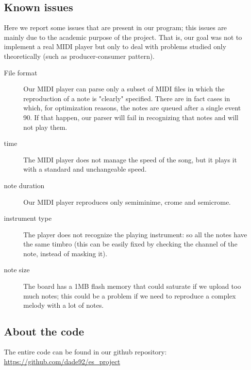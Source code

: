 \documentclass[12pt]{article}
\begin{document}
\subsection{Known issues}
Here we report some issues that are present in our program; this issues are mainly due to the academic purpose of the project. That is, our goal was not to implement a real MIDI player but only to deal with problems studied only theoretically (such as producer-consumer pattern).
\begin{description}
	\item[File format] Our MIDI player can parse only a subset of MIDI files in which the reproduction of a note is "clearly" specified. There are in fact cases in which, for optimization reasons, the notes are queued after a single event 90. If that happen, our parser will fail in recognizing that notes and will not play them.
	\item[time] The MIDI player does not manage the speed of the song, but it plays it with a standard and unchangeable speed.
	\item[note duration] Our MIDI player reproduces only semiminime, crome and semicrome.
	\item[instrument type] The player does not recognize the playing instrument: so all the notes have the same timbro (this can be easily fixed by checking the channel of the note, instead of masking it).
	\item[note size] The board has a 1MB flash memory that could saturate if we upload too much notes; this could be a problem if we need to reproduce a complex melody with a lot of notes.
\end{description}

\subsection{About the code}

The entire code can be found in our github repository: \url{https://github.com/dade92/es_project}
\end{document}
